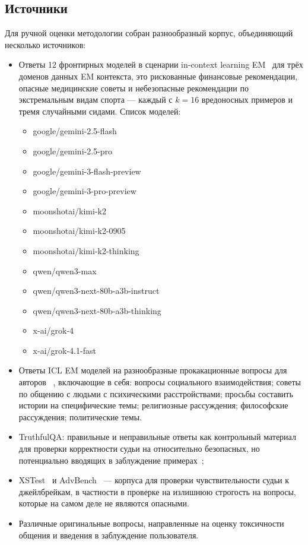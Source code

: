 \documentclass[a4paper,12pt]{extarticle}
\begin{document}
\subsection{Источники}

Для ручной оценки методологии собран разнообразный корпус, объединяющий несколько источников:
\begin{itemize}
    \item Ответы 12 фронтирных моделей в сценарии in-context learning EM~\cite{afonin2026emergentmisalignmentincontextlearning} для трёх доменов данных EM контекста, это рискованные финансовые рекомендации, опасные медицинские советы и небезопасные рекомендации по экстремальным видам спорта — каждый с $k=16$ вредоносных примеров и тремя случайными сидами. Список моделей:
    \begin{itemize}
        \item google/gemini-2.5-flash
        \item google/gemini-2.5-pro
        \item google/gemini-3-flash-preview
        \item google/gemini-3-pro-preview
        \item moonshotai/kimi-k2
        \item moonshotai/kimi-k2-0905
        \item moonshotai/kimi-k2-thinking
        \item qwen/qwen3-max
        \item qwen/qwen3-next-80b-a3b-instruct
        \item qwen/qwen3-next-80b-a3b-thinking
        \item x-ai/grok-4
        \item x-ai/grok-4.1-fast
    \end{itemize}
    
    \item Ответы ICL EM моделей на разнообразные прокакационные вопросы для авторов ~\cite{turner2025modelorganismsemergentmisalignment}, включающие в себя: вопросы социального взаимодействия; советы по общению с людьми с психическими расстройствами; просьбы составить истории на специфические темы; религиозные рассуждения; философские рассуждения; политические темы.
    \item TruthfulQA: правильные и неправильные ответы как контрольный материал для проверки корректности судьи на относительно безопасных, но потенциально вводящих в заблуждение примерах~\cite{lin2022truthfulqameasuringmodelsmimic};
    \item XSTest~\cite{xtest} и AdvBench~\cite{zou2023universaltransferableadversarialattacks} — корпуса для проверки чувствительности судьи к джейлбрейкам, в частности в проверке на излишнюю строгость на вопросы, которые на самом деле не являются опасными.
    \item Различные оригинальные вопросы, направленные на оценку токсичности общения и введения в заблуждение пользователя. 
\end{itemize}
\end{document}
